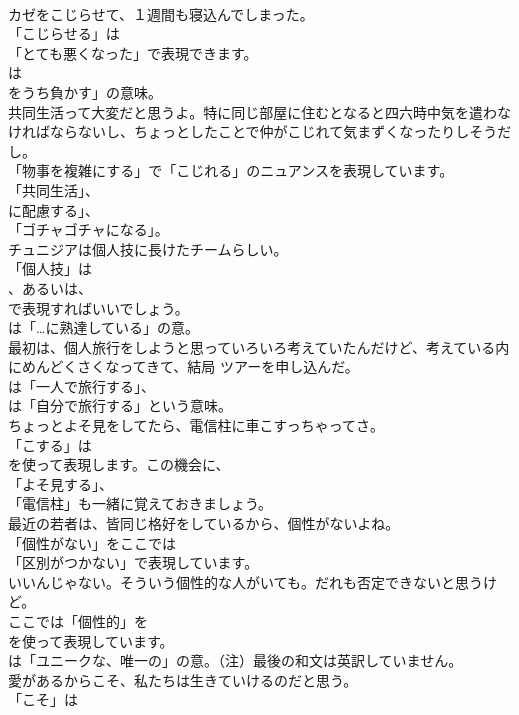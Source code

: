 \documentclass[8pt]{extreport}
\begin{document}
\begin{CJK}{UTF8}{min}
\\	カゼをこじらせて、１週間も寝込んでしまった。 
\\	「こじらせる」は
\\	「とても悪くなった」で表現できます。
\\	は
\\	をうち負かす」の意味。	
\\	共同生活って大変だと思うよ。特に同じ部屋に住むとなると四六時中気を遣わなければならないし、ちょっとしたことで仲がこじれて気まずくなったりしそうだし。 
\\	「物事を複雑にする」で「こじれる」のニュアンスを表現しています。
\\	「共同生活」、
\\	に配慮する」、
\\	「ゴチャゴチャになる」。	
\\	チュニジアは個人技に長けたチームらしい。 
\\	「個人技」は 
\\	、あるいは、
\\	で表現すればいいでしょう。
\\	は「…に熟達している」の意。	
\\	最初は、個人旅行をしようと思っていろいろ考えていたんだけど、考えている内にめんどくさくなってきて、結局 ツアーを申し込んだ。 
\\	は「一人で旅行する」、
\\	は「自分で旅行する」という意味。	
\\	ちょっとよそ見をしてたら、電信柱に車こすっちゃってさ。 
\\	「こする」は
\\	を使って表現します。この機会に、
\\	「よそ見する」、
\\	「電信柱」も一緒に覚えておきましょう。	
\\	最近の若者は、皆同じ格好をしているから、個性がないよね。 
\\	「個性がない」をここでは
\\	「区別がつかない」で表現しています。	
\\	いいんじゃない。そういう個性的な人がいても。だれも否定できないと思うけど。 
\\	ここでは「個性的」を 
\\	を使って表現しています。
\\	は「ユニークな、唯一の」の意。（注）最後の和文は英訳していません。	
\\	愛があるからこそ、私たちは生きていけるのだと思う。 
\\	「こそ」は

\end{CJK}
\end{document}
